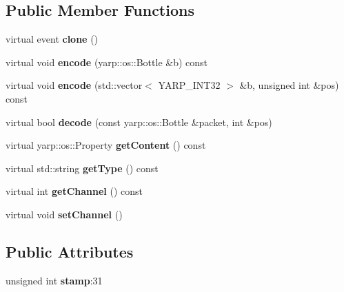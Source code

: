 \subsection*{Public Member Functions}
\begin{DoxyCompactItemize}
\item 
virtual event {\bfseries clone} ()\hypertarget{classev_1_1vEvent_a44f88f43a5c6b5aa6d93001a11f9309b}{}\label{classev_1_1vEvent_a44f88f43a5c6b5aa6d93001a11f9309b}

\item 
virtual void {\bfseries encode} (yarp\+::os\+::\+Bottle \&b) const \hypertarget{classev_1_1vEvent_a66d9e4d833031c146cc0ac3af332b1cc}{}\label{classev_1_1vEvent_a66d9e4d833031c146cc0ac3af332b1cc}

\item 
virtual void {\bfseries encode} (std\+::vector$<$ Y\+A\+R\+P\+\_\+\+I\+N\+T32 $>$ \&b, unsigned int \&pos) const \hypertarget{classev_1_1vEvent_a991a8eae71272b74d039e0bfabb501db}{}\label{classev_1_1vEvent_a991a8eae71272b74d039e0bfabb501db}

\item 
virtual bool {\bfseries decode} (const yarp\+::os\+::\+Bottle \&packet, int \&pos)\hypertarget{classev_1_1vEvent_a75132601bf3f958212fd3793b7e53139}{}\label{classev_1_1vEvent_a75132601bf3f958212fd3793b7e53139}

\item 
virtual yarp\+::os\+::\+Property {\bfseries get\+Content} () const \hypertarget{classev_1_1vEvent_adabb906a71f96c89d6d539c899044622}{}\label{classev_1_1vEvent_adabb906a71f96c89d6d539c899044622}

\item 
virtual std\+::string {\bfseries get\+Type} () const \hypertarget{classev_1_1vEvent_a90411228dd74d994854b501b7cae7ff1}{}\label{classev_1_1vEvent_a90411228dd74d994854b501b7cae7ff1}

\item 
virtual int {\bfseries get\+Channel} () const \hypertarget{classev_1_1vEvent_a8ddb67938981d00a7275417e511ad3a5}{}\label{classev_1_1vEvent_a8ddb67938981d00a7275417e511ad3a5}

\item 
virtual void {\bfseries set\+Channel} ()\hypertarget{classev_1_1vEvent_a2cf5bf1d01ad2757a82b6e07d7e2a5da}{}\label{classev_1_1vEvent_a2cf5bf1d01ad2757a82b6e07d7e2a5da}

\end{DoxyCompactItemize}
\subsection*{Public Attributes}
\begin{DoxyCompactItemize}
\item 
unsigned int {\bfseries stamp}\+:31\hypertarget{classev_1_1vEvent_ad4e003653fa59b37682addefce835490}{}\label{classev_1_1vEvent_ad4e003653fa59b37682addefce835490}

\end{DoxyCompactItemize}
